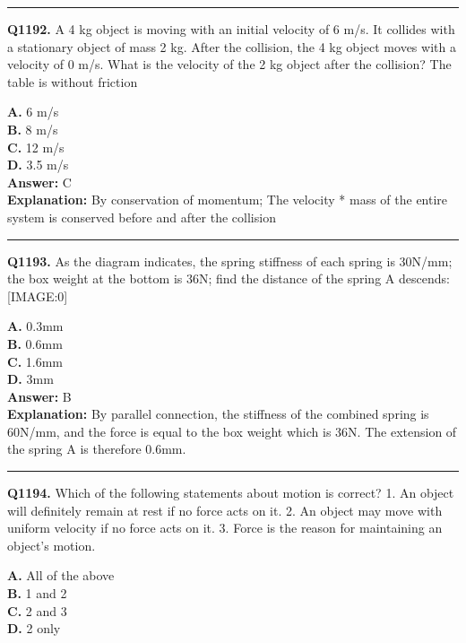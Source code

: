 \documentclass[12pt]{article}
\begin{document}
\hrule
\vspace{1em}


\noindent
\textbf{Q1192.} A 4 kg object is moving with an initial velocity of 6 m/s. It collides with a stationary object of mass 2 kg. After the collision, the 4 kg object moves with a velocity of 0 m/s. What is the velocity of the 2 kg object after the collision? The table is without friction



\textbf{A.} 6 m/s \\
\textbf{B.} 8 m/s \\
\textbf{C.} 12 m/s \\
\textbf{D.} 3.5 m/s \\

\textbf{Answer:} C \\
\textbf{Explanation:} By conservation of momentum; The velocity * mass of the entire system is conserved before and after the collision

\hrule
\vspace{1em}


\noindent
\textbf{Q1193.} As the diagram indicates, the spring stiffness of each spring is 30N/mm; the box weight at the bottom is 36N; find the distance of the spring A descends:
[IMAGE:0]



\textbf{A.} 0.3mm \\
\textbf{B.} 0.6mm \\
\textbf{C.} 1.6mm \\
\textbf{D.} 3mm \\

\textbf{Answer:} B \\
\textbf{Explanation:} By parallel connection, the stiffness of the combined spring is 60N/mm, and the force is equal to the box weight which is 36N. The extension of the spring A is therefore 0.6mm.

\hrule
\vspace{1em}


\noindent
\textbf{Q1194.} Which of the following statements about motion is correct?
1.
An object will definitely remain at rest if no force acts on it.
2.
An object may move with uniform velocity if no force acts on it.
3.
Force is the reason for maintaining an object's motion.



\textbf{A.} All of the above \\
\textbf{B.} 1 and 2 \\
\textbf{C.} 2 and 3 \\
\textbf{D.} 2 only \\
\end{document}
